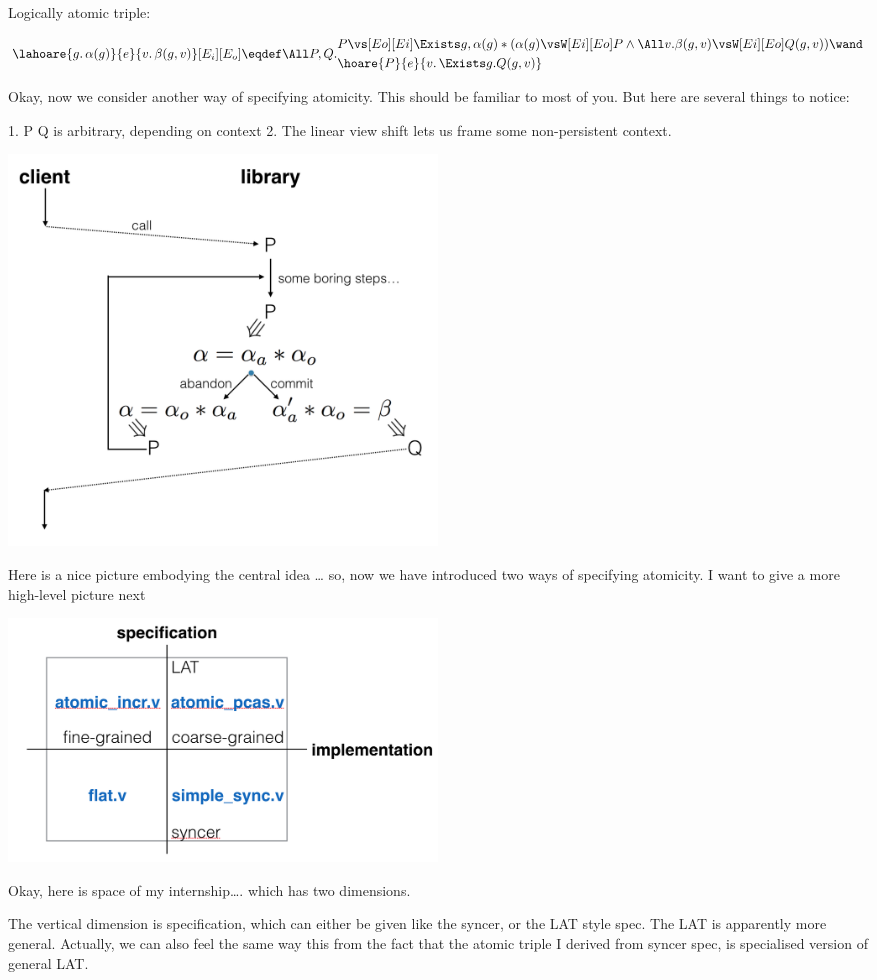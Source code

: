 \documentclass[10pt]{article}
\begin{document}
Logically atomic triple:

\[  
    \lahoare{g.\, \alpha(g)}{e}{v.\, \beta(g, v)}[E_i][E_o] \eqdef
    \All P, Q.
    \begin{aligned}
          &P \vs[Eo][Ei] \Exists g, \alpha(g) * (\alpha(g) \vsW[Ei][Eo] P \land \All v. \beta(g, v) \vsW[Ei][Eo] Q(g, v)) \wand \\
          &\hoare{P}{e}{v.\, \Exists g. Q(g, v)}
    \end{aligned}\]


Okay, now we consider another way of specifying atomicity. This should be familiar to most of you. But here are several things to notice:

1. P Q is arbitrary, depending on context
2. The linear view shift lets us frame some non-persistent context.

\includegraphics[width=0.5\textwidth]{lat}

Here is a nice picture embodying the central idea … so, now we have introduced two ways of specifying atomicity. I want to give a more high-level picture next

\includegraphics[width=0.5\textwidth]{ispace}

Okay, here is space of my internship…. which has two dimensions.

The vertical dimension is specification, which can either be given like the syncer, or the LAT style spec. The LAT is apparently more general. Actually, we can also feel the same way this from the fact that the atomic triple I derived from syncer spec, is specialised version of general LAT.
\end{document}
